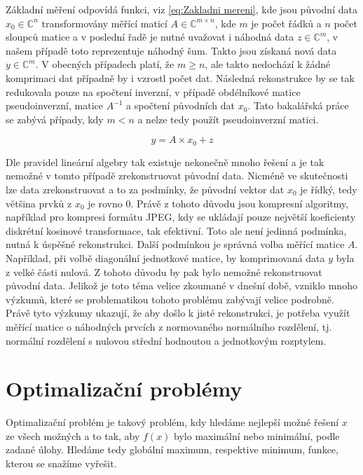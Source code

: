 \documentclass[FM,BP]{tulthesis}
\newcounter{Vzorce}
\begin{document}
Základní měření odpovídá funkci, viz \ref{eq:Zakladni mereni}, kde jsou původní data $x_0 \in \mathbb{C}^n$ transformovány měřící maticí $A \in \mathbb{C} ^{m \times n}$, kde $m$ je počet řádků a $n$ počet sloupců matice a v poslední řadě je nutné uvažovat i náhodná data $z \in \mathbb{C}^m$, v našem případě toto reprezentuje náhodný šum. Takto jsou získaná nová data $y \in \mathbb{C}^m$. V obecných případech platí, že $m \geq n$, ale takto nedochází k žádné komprimaci dat případně by i vzrostl počet dat. Následná rekonstrukce by se tak redukovala pouze na spočtení inverzní, v případě obdélníkové matice pseudoinverzní, matice $A^{-1}$ a spočtení původních dat $x_0$. Tato bakalářská práce se zabývá případy, kdy $m < n$ a nelze tedy použít pseudoinverzní matici.

\begin{equation} \label{eq:Zakladni mereni} \tag{Vzorec \theVzorce}
y = A \times x_0 + z
\end{equation}

Dle pravidel lineární algebry tak existuje nekonečně mnoho řešení a je tak nemožné v tomto případě zrekonstruovat původní data. Nicméně ve skutečnosti lze data zrekonstruovat a to za podmínky, že původní vektor dat $x_0$ je řídký, tedy většina prvků z $x_0$ je rovno $0$. Právě z tohoto důvodu jsou kompresní algoritmy, například pro kompresi formátu JPEG, kdy se ukládají pouze největší koeficienty diskrétní kosinové transformace, tak efektivní. Toto ale není jedinná podmínka, nutná k úspěšné rekonstrukci. Další podmínkou je správná volba měřící matice $A$. Například, při volbě diagonální jednotkové matice, by komprimovaná data $y$ byla z velké části nulová. Z tohoto důvodu by pak bylo nemožné rekonstruovat původní data. Jelikož je toto téma velice zkoumané v dnešní době, vzniklo mnoho výzkumů, které se problematikou tohoto problému zabývají velice podrobně. Právě tyto výzkumy ukazují, že aby došlo k jisté rekonstrukci, je potřeba využít měřící matice o náhodných prvcích z normovaného normálního rozdělení, tj. normální rozdělení s nulovou střední hodnoutou a jednotkovým rozptylem.

\chapter{Optimalizační problémy}
\label{ch:optproblem}
Optimalizační problém je takový problém, kdy hledáme nejlepší možné řešení $x$ ze všech možných a to tak, aby $f(x)$ bylo maximální nebo minimální, podle zadané úlohy. Hledáme tedy globální maximum, respektive minimum, funkce, kterou se snažíme vyřešit. 
\end{document}
